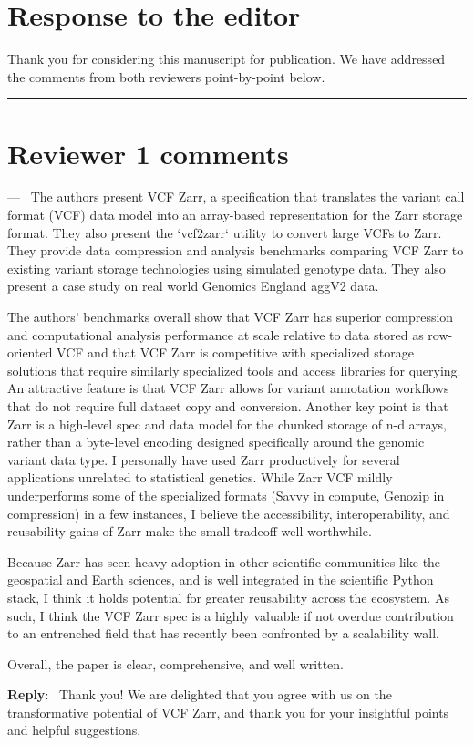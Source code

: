 \documentclass[11pt]{article}
\newcounter{reviewer}
\newcounter{point}[reviewer]
\renewcommand{\thepoint}{\thereviewer.\arabic{point}}
\newcommand{\reviewersection}{\stepcounter{reviewer} \bigskip \hrule}
\newenvironment{point}
   {\refstepcounter{point} \bigskip \noindent {\textbf{Point~\thepoint} } ---\ }
   {\par }
\newenvironment{reply}
   {\medskip \noindent \begin{sf}\textbf{Reply}:\  }
   {\medskip \end{sf}}
\begin{document}
\section*{Response to the editor}
Thank you for considering this manuscript for publication.  
We have addressed the comments from both reviewers point-by-point
below.

\reviewersection
\section*{Reviewer 1 comments}

\begin{point}
The authors present VCF Zarr, a specification that translates the variant call
format (VCF) data model into an array-based representation for the Zarr storage
format. They also present the `vcf2zarr` utility to convert large VCFs to Zarr.
They provide data compression and analysis benchmarks comparing VCF Zarr to
existing variant storage technologies using simulated genotype data. They also
present a case study on real world Genomics England aggV2 data.

The authors' benchmarks overall show that VCF Zarr has superior compression and
computational analysis performance at scale relative to data stored as
row-oriented VCF and that VCF Zarr is competitive with specialized storage
solutions that require similarly specialized tools and access libraries for
querying. An attractive feature is that VCF Zarr allows for variant annotation
workflows that do not require full dataset copy and conversion. Another key
point is that Zarr is a high-level spec and data model for the chunked storage
of n-d arrays, rather than a byte-level encoding designed specifically around
the genomic variant data type. I personally have used Zarr productively for
several applications unrelated to statistical genetics. While Zarr VCF mildly
underperforms some of the specialized formats (Savvy in compute, Genozip in
compression) in a few instances, I believe the accessibility, interoperability,
and reusability gains of Zarr make the small tradeoff well worthwhile. 

Because Zarr has seen heavy adoption in other scientific communities like the
geospatial and Earth sciences, and is well integrated in the scientific Python
stack, I think it holds potential for greater reusability across the ecosystem.
As such, I think the VCF Zarr spec is a highly valuable if not overdue
contribution to an entrenched field that has recently been confronted by a
scalability wall.

Overall, the paper is clear, comprehensive, and well written. 
\end{point}
\begin{reply}
Thank you!  We are delighted that you agree with us on the transformative
potential of VCF Zarr, and thank you for your insightful points and
helpful suggestions.
\end{reply}
\end{document}
